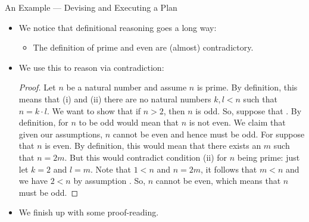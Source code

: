 \documentclass[../slides.tex]{subfiles}
\begin{document}
\begin{frame}{An Example --- Devising and Executing a Plan}

	\begin{itemize}
	
	
		\item We notice that definitional reasoning goes a long way:
		
			\begin{itemize}
			
				\item The definition of prime and even are (almost) contradictory.
			
			\end{itemize}
			
		\item We use this to reason via contradiction:
	
		 \begin{proof}
		{\small Let $n$ be a natural number and assume $n$ is prime. By definition, this means that (i)   and (ii) there are no natural numbers $k,l<n$ such that $n=k\cdot l$. We want to show that if $n>2$, then $n$ is odd. So, suppose that  . By definition, for $n$ to be odd would mean that $n$ is not even. We claim that given our assumptions, $n$ cannot be even and hence must be odd. For suppose that $n$ is even. By definition, this would mean that there exists an $m$ such that $n=2m$. But this would contradict condition (ii) for $n$ being prime: just let $k=2$ and $l=m$. Note that $1<n$ and $n=2m$, it follows that $m<n$ and we have $2<n$ by assumption . So, $n$ cannot be even, which means that $n$ must be odd.}
		\end{proof}
		
	\pause
	
	\item We finish up with some proof-reading.
	
	\end{itemize}


\end{frame}
\end{document}
